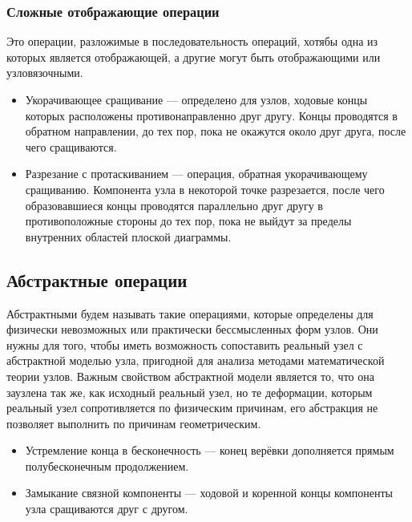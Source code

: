 \subsubsection{Сложные отображающие операции}
Это операции, разложимые в последовательность операций, хотябы одна из которых является отображающей, а другие могут быть отображающими или узловязочными.

\begin{itemize}
\item Укорачивающее сращивание --- определено для узлов, ходовые концы которых расположены противонаправленно друг другу. Концы проводятся в обратном направлении, до тех пор, пока не окажутся около друг друга, после чего сращиваются.
\item Разрезание с протаскиванием --- операция, обратная укорачивающему сращиванию. Компонента узла в некоторой точке разрезается, после чего образовавшиеся концы проводятся параллельно друг другу в противоположные стороны до тех пор, пока не выйдут за пределы внутренних областей плоской диаграммы.
\end{itemize}

\subsection{Абстрактные операции}

Абстрактными будем называть такие операциями, которые определены для физически невозможных или практически бессмысленных форм узлов. Они нужны для того, чтобы иметь возможность сопоставить реальный узел с абстрактной моделью узла, пригодной для анализа методами математической теории узлов. Важным свойством абстрактной модели является то, что она заузлена так же, как исходный реальный узел, но те деформации, которым реальный узел сопротивляется по физическим причинам, его абстракция не позволяет выполнить по причинам геометрическим.

\begin{itemize}
\item Устремление конца в бесконечность --- конец верёвки дополняется прямым полубесконечным продолжением.
\item Замыкание связной компоненты --- ходовой и коренной концы компоненты узла сращиваются друг с другом.
\end{itemize}
